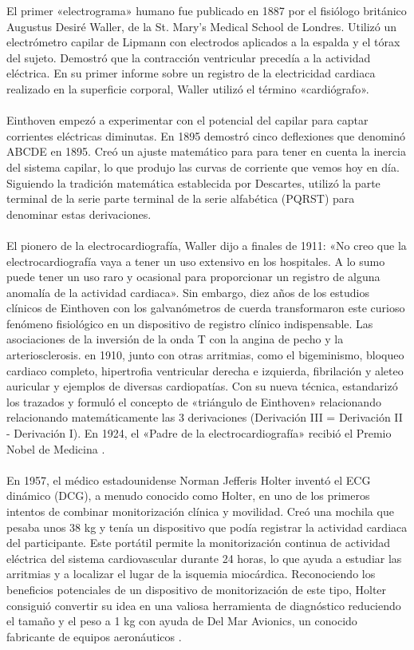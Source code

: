 \documentclass[spanish,11pt,letterpaper,oneside]{memoir}
\begin{document}
    El primer «electrograma» humano fue publicado en 1887 por el fisiólogo británico Augustus Desiré Waller, de la St. Mary's Medical School de Londres. Utilizó un electrómetro capilar de Lipmann con electrodos aplicados a la espalda y el tórax del sujeto. Demostró que la contracción ventricular precedía a la actividad eléctrica. En su primer informe sobre un registro de la electricidad cardiaca realizado en la superficie corporal, Waller utilizó el término «cardiógrafo».  \\
    \\
    Einthoven empezó a experimentar con el potencial del capilar para captar corrientes eléctricas diminutas. En 1895 demostró cinco deflexiones que denominó ABCDE en 1895. Creó un ajuste matemático para para tener en cuenta la inercia del sistema capilar, lo que produjo las curvas de corriente que vemos hoy en día. Siguiendo la tradición matemática establecida por Descartes, utilizó la parte terminal de la serie parte terminal de la serie alfabética (PQRST) para denominar estas derivaciones. \\
    \\
    El pionero de la electrocardiografía, Waller dijo a finales de 1911: «No creo que la electrocardiografía vaya a tener un uso extensivo en los hospitales. A lo sumo puede tener un uso raro y ocasional para proporcionar un registro de alguna anomalía de la actividad cardiaca». Sin embargo, diez años de los estudios clínicos de Einthoven con los galvanómetros de cuerda transformaron este curioso fenómeno fisiológico en un dispositivo de registro clínico indispensable. Las asociaciones de la inversión de la onda T con la angina de pecho y la arteriosclerosis. en 1910, junto con otras arritmias, como el bigeminismo, bloqueo cardiaco completo, hipertrofia ventricular derecha e izquierda, fibrilación y aleteo auricular y ejemplos de diversas cardiopatías. Con su nueva técnica, estandarizó los trazados y formuló el concepto de «triángulo de Einthoven» relacionando relacionando matemáticamente las 3 derivaciones (Derivación III = Derivación II - Derivación I). En 1924, el «Padre de la electrocardiografía» recibió el Premio Nobel de Medicina \cite{vincent2022}.\\
    \\
    En 1957, el médico estadounidense Norman Jefferis Holter inventó el ECG dinámico (DCG), a menudo conocido como Holter, en uno de los primeros intentos de combinar monitorización clínica y movilidad. Creó una mochila que pesaba unos 38 kg y tenía un dispositivo que podía registrar la actividad cardiaca del participante. Este portátil permite la monitorización continua de actividad eléctrica del sistema cardiovascular durante 24 horas, lo que ayuda a estudiar las arritmias y a localizar el lugar de la isquemia miocárdica. Reconociendo los beneficios potenciales de un dispositivo de monitorización de este tipo, Holter consiguió convertir su idea en una valiosa herramienta de diagnóstico reduciendo el tamaño y el peso a 1 kg con ayuda de Del Mar Avionics, un conocido fabricante de equipos aeronáuticos \cite{vincent2022}.\\
\end{document}
